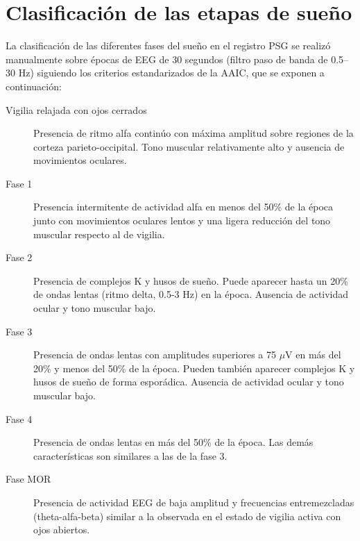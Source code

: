 
\section{Clasificaci\'on de las etapas de sue\~no}

La clasificaci\'on de las diferentes fases del sue\~no en el registro PSG se realiz\'o manualmente 
sobre \'epocas de EEG de 30 segundos (filtro paso de banda de 0.5--30 Hz) siguiendo los criterios 
estandarizados de la AAIC\cite{Hori01}, que se exponen a continuación:
\begin{description}
\item[Vigilia relajada con ojos cerrados] Presencia de ritmo alfa contin\'uo con m\'axima amplitud 
sobre regiones de la corteza parieto-occipital. Tono muscular relativamente alto y ausencia de 
movimientos oculares.

\item[Fase 1] %
Presencia intermitente de 
actividad alfa en menos del 50\% de la \'epoca junto con movimientos oculares lentos y una ligera 
reducci\'on del tono muscular respecto al de vigilia.

\item[Fase 2] Presencia de complejos K y husos de sue\~no. Puede aparecer hasta un 20\% de ondas 
lentas (ritmo delta, 0.5-3 Hz) en la \'epoca. Ausencia de actividad ocular y tono muscular bajo.

\item[Fase 3] Presencia de ondas lentas con amplitudes superiores a 75 $\mu$V en m\'as del
20\% y menos del 50\% de la \'epoca. Pueden tambi\'en aparecer complejos K y husos de sue\~no de 
forma espor\'adica. Ausencia de actividad ocular y tono muscular bajo.

\item[Fase 4] Presencia de ondas lentas en m\'as del 50\% de la época. Las dem\'as 
caracter\'isticas son similares a las de la fase 3.

\item[Fase MOR] Presencia de actividad EEG de baja amplitud y frecuencias entremezcladas 
(theta-alfa-beta) similar a la observada en el estado de vigilia activa con ojos abiertos.
\end{description}


